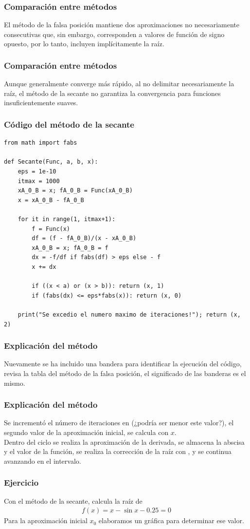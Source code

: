 \begin{frame}
\frametitle{Comparación entre métodos}
El método de la falsa posición mantiene dos aproximaciones no necesariamente consecutivas que, sin embargo, corresponden a valores de función de signo opuesto, por lo tanto, incluyen implícitamente la raíz.
\end{frame}
\begin{frame}
\frametitle{Comparación entre métodos}
Aunque generalmente converge más rápido, al no delimitar necesariamente la raíz, el método de la secante no garantiza la convergencia para funciones insuficientemente suaves.
\end{frame}
\begin{frame}
\frametitle{Código del método de la secante}
\begin{lstlisting}[caption=Código para el método de la secante, style=codigopython]
from math import fabs

def Secante(Func, a, b, x):
	eps = 1e-10
	itmax = 1000
	xA_0_B = x; fA_0_B = Func(xA_0_B)
	x = xA_0_B - fA_0_B

	for it in range(1, itmax+1):
		f = Func(x)
		df = (f - fA_0_B)/(x - xA_0_B)
		xA_0_B = x; fA_0_B = f
		dx = -f/df if fabs(df) > eps else - f
		x += dx

		if ((x < a) or (x > b)): return (x, 1)
		if (fabs(dx) <= eps*fabs(x)): return (x, 0)
	
	print("Se excedio el numero maximo de iteraciones!"); return (x, 2)
\end{lstlisting}
\end{frame}
\begin{frame}
\frametitle{Explicación del método}
Nuevamente se ha incluido una bandera para identificar la ejecución del código, revisa la tabla del método de la falsa posición, el significado de las banderas es el mismo.
\end{frame}
\begin{frame}
\frametitle{Explicación del método}
Se incrementó el número de iteraciones en  (¿podría ser menor este valor?), el segundo valor de la aproximación inicial, se calcula con $x$.
\\
\bigskip
Dentro del ciclo  se realiza la aproximación de la derivada, se almacena la abscisa y el valor de la función, se realiza la corrección de la raíz con , y se continua avanzando en el intervalo.
\end{frame}
\begin{frame}[fragile]
\frametitle{Ejercicio}
Con el método de la secante, calcula la raíz de
\begin{align*}
f(x) = x - \sin x - 0.25 = 0
\end{align*}
Para la aproximación inicial $x_{0}$ elaboramos un gráfica para determinar ese valor.
\end{frame}
